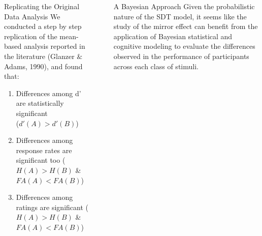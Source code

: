 \documentclass[final]{beamer}
\newlength{\sepwid}
\newlength{\onecolwid}
\newlength{\twocolwid}
\begin{document}
\begin{frame}[t]
\begin{columns}[t]
\begin{column}{\onecolwid}
\begin{alertblock}{Replicating the Original Data Analysis}
We conducted a step by step replication of the mean-based analysis reported in the literature (Glanzer $\&$ Adams, 1990), and found that:
\begin{enumerate}
\item Differences among d' are statistically significant \\
($d'(A) > d'(B)$)
\item Differences among response rates are significant too ($H(A)>H(B)$ \& $FA(A)<FA(B)$)
\item Differences among ratings are significant ($H(A)>H(B)$ \& $FA(A)<FA(B)$)
\end{enumerate}
\end{alertblock} 



\end{column} %
\begin{column}{\sepwid}\end{column} %
\begin{column}{\twocolwid} %
\vspace{-2.5cm}


\begin{alertblock}{A Bayesian Approach}
Given the probabilistic nature of the SDT model, it seems like the study of the mirror effect can benefit from the application of Bayesian statistical and cognitive modeling to evaluate the differences observed in the performance of participants across each class of stimuli.
\end{alertblock} 

\setlength{\onecolwid}{0.24\paperwidth}
\begin{columns}[t,totalwidth=\twocolwid] %
\begin{column}{\onecolwid}\vspace{-.6in} %



\end{column}
\end{columns}
\end{column}
\end{columns}
\end{frame}
\end{document}
